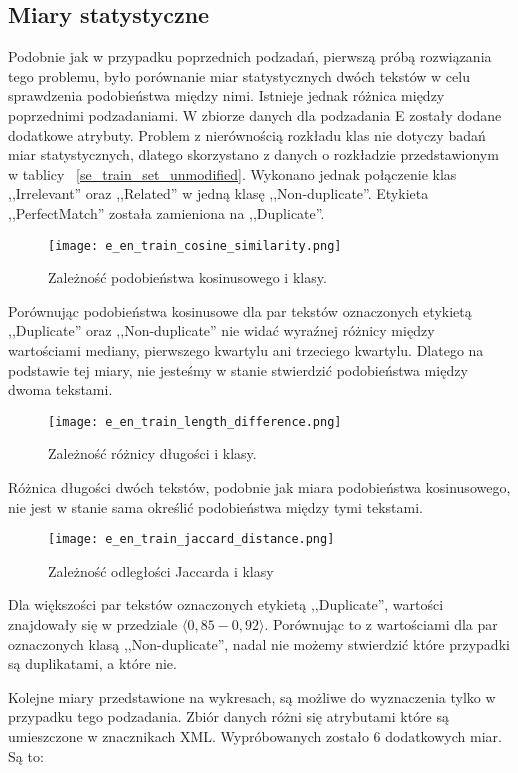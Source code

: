 \subsection{Miary statystyczne}

Podobnie jak w przypadku poprzednich podzadań, pierwszą próbą rozwiązania tego problemu, było porównanie miar statystycznych dwóch tekstów w celu sprawdzenia podobieństwa między nimi. Istnieje jednak różnica między poprzednimi podzadaniami. W zbiorze danych dla podzadania E zostały dodane dodatkowe atrybuty. Problem z nierównością rozkładu klas nie dotyczy badań miar statystycznych, dlatego skorzystano z danych o rozkładzie przedstawionym w tablicy~ \ref{se_train_set_unmodified}. Wykonano jednak połączenie klas ,,Irrelevant'' oraz ,,Related'' w jedną klasę ,,Non-duplicate''. Etykieta ,,PerfectMatch'' została zamieniona na ,,Duplicate''.

\begin{figure}[H]
\centering
\texttt{[image: e\_en\_train\_cosine\_similarity.png]}
\caption{Zależność podobieństwa kosinusowego i klasy.}
\end{figure}

Porównując podobieństwa kosinusowe dla par tekstów oznaczonych etykietą ,,Duplicate'' oraz ,,Non-duplicate'' nie widać wyraźnej różnicy między wartościami mediany, pierwszego kwartylu ani trzeciego kwartylu. Dlatego na podstawie tej miary, nie jesteśmy w stanie stwierdzić podobieństwa między dwoma tekstami.

\begin{figure}[H]
\centering
\texttt{[image: e\_en\_train\_length\_difference.png]}
\caption{Zależność różnicy długości i klasy.}
\end{figure}

Różnica długości dwóch tekstów, podobnie jak miara podobieństwa kosinusowego, nie jest w stanie sama określić podobieństwa między tymi tekstami.

\begin{figure}[H]
\centering
\texttt{[image: e\_en\_train\_jaccard\_distance.png]}
\caption{Zależność odległości Jaccarda i klasy}
\end{figure}

Dla większości par tekstów oznaczonych etykietą ,,Duplicate'', wartości znajdowały się w przedziale $\langle 0,85-0,92 \rangle$. Porównując to z wartościami dla par oznaczonych klasą ,,Non-duplicate'', nadal nie możemy stwierdzić które przypadki są duplikatami, a które nie.

Kolejne miary przedstawione na wykresach, są możliwe do wyznaczenia tylko w przypadku tego podzadania. Zbiór danych różni się atrybutami które są umieszczone w znacznikach XML. Wypróbowanych zostało 6 dodatkowych miar. Są to:

